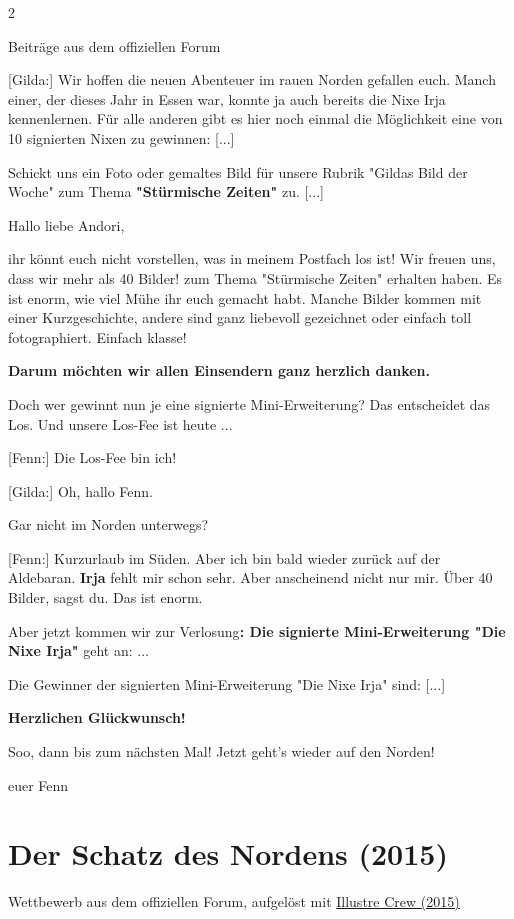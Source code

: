 \documentclass[10pt, a4paper, oneside]{book}
\newcommand{\fillbreak}{\vspace*{\fill}\columnbreak}
\newcommand{\produkt}[1]{%
    \section{#1}%
    \label{Produkt: #1}%
}
\newcommand{\refstorytext}[1]{\hyperref[Storytext: #1]{#1}}
\begin{document}
\begin{multicols}{2}
\begin{center}
    Beiträge aus dem offiziellen Forum
\end{center}

[Gilda:] Wir hoffen die neuen Abenteuer im rauen Norden gefallen euch. Manch einer, der dieses Jahr in Essen war, konnte ja auch bereits die Nixe Irja kennenlernen. Für alle anderen gibt es hier noch einmal die Möglichkeit eine von 10 signierten Nixen zu gewinnen: [...]

Schickt uns ein Foto oder gemaltes Bild für unsere Rubrik "Gildas Bild der Woche" zum Thema \textbf{"Stürmische Zeiten"} zu. [...]

Hallo liebe Andori,

ihr könnt euch nicht vorstellen, was in meinem Postfach los ist!
Wir freuen uns, dass wir mehr als 40 Bilder! zum Thema "Stürmische Zeiten" erhalten haben. Es ist enorm, wie viel Mühe ihr euch gemacht habt. Manche Bilder kommen mit einer Kurzgeschichte, andere sind ganz liebevoll gezeichnet oder einfach toll fotographiert. Einfach klasse!

\textbf{Darum möchten wir allen Einsendern ganz herzlich danken.}

Doch wer gewinnt nun je eine signierte Mini-Erweiterung?
Das entscheidet das Los. Und unsere Los-Fee ist heute ...

[Fenn:] Die Los-Fee bin ich!

[Gilda:] Oh, hallo Fenn.

Gar nicht im Norden unterwegs?

[Fenn:] Kurzurlaub im Süden. Aber ich bin bald wieder zurück auf der Aldebaran. \textbf{Irja} fehlt mir schon sehr. Aber anscheinend nicht nur mir. Über 40 Bilder, sagst du. Das ist enorm.

Aber jetzt kommen wir zur Verlosung\textbf{: Die signierte Mini-Erweiterung "Die Nixe Irja"} geht an: ...

Die Gewinner der signierten Mini-Erweiterung "Die Nixe Irja" sind: [...]

\textbf{Herzlichen Glückwunsch!}

Soo, dann bis zum nächsten Mal! Jetzt geht's wieder auf den Norden!

euer Fenn


\fillbreak
\produkt{Der Schatz des Nordens (2015)}

\begin{center}
    Wettbewerb aus dem offiziellen Forum, aufgelöst mit \refstorytext{Illustre Crew (2015)}
\end{center}


\end{multicols}
\end{document}
